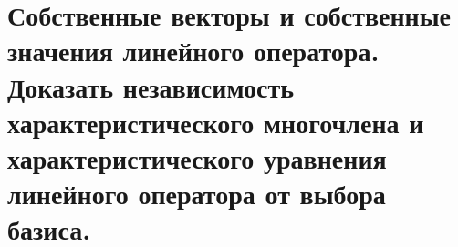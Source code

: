 \section{
    Собственные векторы и собственные значения линейного оператора. Доказать независимость характеристического многочлена и характеристического уравнения линейного оператора от выбора базиса.
}


